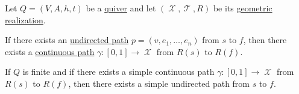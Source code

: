 \begin{proposition}\label{thm:quiver_geometric_realization_paths}
  Let \( Q = (V, A, h, t) \) be a \hyperref[def:quiver]{quiver} and let \( (\mscrX, \mscrT, R) \) be its \hyperref[def:quiver_geometric_realization]{geometric realization}.

  \begin{thmenum}
     If there exists an \hyperref[def:quiver_path/undirected]{undirected path} \( p = (v, e_1, \ldots, e_n) \) from \( s \) to \( f \), then there exists a \hyperref[def:parametric_curve]{continuous path} \( \gamma: [0, 1] \to \mscrX \) from \( R(s)  \) to \( R(f) \).

     If \( Q \) is finite and if there exists a simple continuous path \( \gamma: [0, 1] \to \mscrX \) from \( R(s)  \) to \( R(f) \), then there exists a simple undirected path from \( s \) to \( f \).
  \end{thmenum}
\end{proposition}
